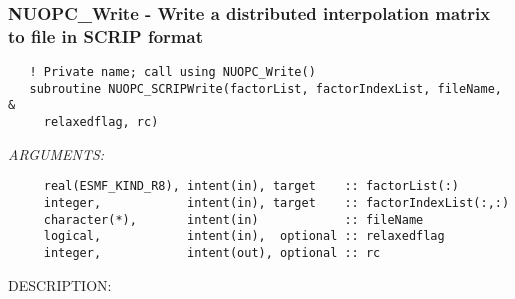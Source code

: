  
\setlength{\oldparskip}{\parskip}
\setlength{\parskip}{1.5ex}
\setlength{\oldparindent}{\parindent}
\setlength{\parindent}{0pt}
\setlength{\oldbaselineskip}{\baselineskip}
\setlength{\baselineskip}{11pt}
 
\def\bv{\begin{verbatim}}
\def\ev{\end{verbatim}}
\def\be{\begin{equation}}
\def\ee{\end{equation}}
\def\bea{\begin{eqnarray}}
\def\eea{\end{eqnarray}}
\def\bi{\begin{itemize}}
\def\ei{\end{itemize}}
\def\bn{\begin{enumerate}}
\def\en{\end{enumerate}}
\def\bd{\begin{description}}
\def\ed{\end{description}}
\def\({\left (}
\def\){\right )}
\def\[{\left [}
\def\]{\right ]}
\def\<{\left  \langle}
\def\>{\right \rangle}
\def\cI{{\cal I}}
\def\diag{\mathop{\rm diag}}
\def\tr{\mathop{\rm tr}}


 
\subsubsection [NUOPC\_Write] {NUOPC\_Write - Write a distributed interpolation matrix to file in SCRIP format}


\begin{verbatim}   ! Private name; call using NUOPC_Write()
   subroutine NUOPC_SCRIPWrite(factorList, factorIndexList, fileName, &
     relaxedflag, rc)\end{verbatim}{\em ARGUMENTS:}
\begin{verbatim}     real(ESMF_KIND_R8), intent(in), target    :: factorList(:)
     integer,            intent(in), target    :: factorIndexList(:,:) 
     character(*),       intent(in)            :: fileName
     logical,            intent(in),  optional :: relaxedflag
     integer,            intent(out), optional :: rc\end{verbatim}
{\sf DESCRIPTION:\\ }


